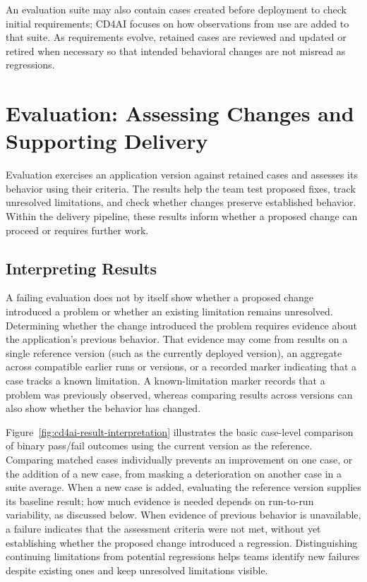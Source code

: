 An evaluation suite may also contain
cases created before deployment to check initial requirements; CD4AI focuses on
how observations from use are added to that suite. As requirements evolve,
retained cases are reviewed and updated or retired when necessary so that
intended behavioral changes are not misread as regressions.

\section{Evaluation: Assessing Changes and Supporting Delivery}
\label{sec:cd4ai-testing}

Evaluation exercises an application version against retained cases and
assesses its behavior using their criteria. The results help the team test
proposed fixes, track unresolved limitations, and check whether changes
preserve established behavior. Within the delivery pipeline, these results
inform whether a proposed change can proceed or requires further work.

\subsection{Interpreting Results}
\label{sec:cd4ai-result-interpretation}

A failing evaluation does not by itself show whether a proposed change
introduced a problem or whether an existing limitation remains unresolved.
Determining whether the change introduced the problem requires evidence about
the application's previous behavior. That evidence may come from results on a
single reference version (such as the currently deployed version), an
aggregate across compatible earlier runs or versions, or a recorded marker
indicating that a case tracks a known limitation. A known-limitation marker
records that a problem was previously observed, whereas comparing results
across versions can also show whether the behavior has changed.

Figure~\ref{fig:cd4ai-result-interpretation} illustrates the basic case-level
comparison of binary pass/fail outcomes using the current version as the
reference. Comparing matched cases individually prevents an improvement on one
case, or the addition of a new case, from masking a deterioration on another
case in a suite average. When a new case is added, evaluating the reference
version supplies its baseline result; how much evidence is needed depends on
run-to-run variability, as discussed below. When evidence of previous behavior
is unavailable, a failure indicates that the assessment criteria were not met,
without yet establishing whether the proposed change introduced a regression.
Distinguishing continuing limitations from potential regressions helps teams
identify new failures despite existing ones and keep unresolved limitations
visible.

